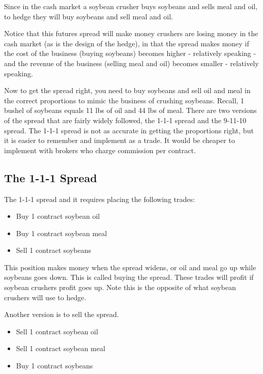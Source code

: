 \documentclass[
  letterpaper,
  DIV=11,
  numbers=noendperiod]{scrreprt}
\providecommand{\tightlist}{%
  \setlength{\itemsep}{0pt}\setlength{\parskip}{0pt}}\usepackage{longtable,booktabs,array}
\begin{document}
Since in the cash market a soybean crusher buys soybeans and sells meal
and oil, to hedge they will buy soybeans and sell meal and oil.

Notice that this futures spread will make money crushers are losing
money in the cash market (as is the design of the hedge), in that the
spread makes money if the cost of the business (buying soybeans) becomes
higher - relatively speaking - and the revenue of the business (selling
meal and oil) becomes smaller - relatively speaking.

Now to get the spread right, you need to buy soybeans and sell oil and
meal in the correct proportions to mimic the business of crushing
soybeans. Recall, 1 bushel of soybeans equals 11 lbs of oil and 44 lbs
of meal. There are two versions of the spread that are fairly widely
followed, the 1-1-1 spread and the 9-11-10 spread. The 1-1-1 spread is
not as accurate in getting the proportions right, but it is easier to
remember and implement as a trade. It would be cheaper to implement with
brokers who charge commission per contract.

\hypertarget{the-1-1-1-spread}{%
\subsection{The 1-1-1 Spread}\label{the-1-1-1-spread}}

The 1-1-1 spread and it requires placing the following trades:

\begin{itemize}
\tightlist
\item
  Buy 1 contract soybean oil
\item
  Buy 1 contract soybean meal
\item
  Sell 1 contract soybeans
\end{itemize}

This position makes money when the spread widens, or oil and meal go up
while soybeans goes down. This is called buying the spread. These trades
will profit if soybean crushers profit goes up. Note this is the
opposite of what soybean crushers will use to hedge.

Another version is to sell the spread.

\begin{itemize}
\tightlist
\item
  Sell 1 contract soybean oil
\item
  Sell 1 contract soybean meal
\item
  Buy 1 contract soybeans
\end{itemize}
\end{document}
